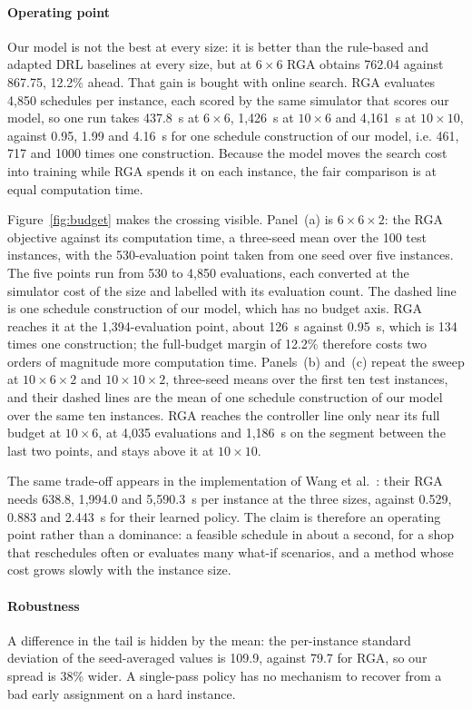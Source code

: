 \paragraph{Operating point}
Our model is not the best at every size: it is better than the rule-based and
adapted DRL baselines at every size, but at $6\times6$ RGA obtains 762.04
against 867.75, 12.2\% ahead. That gain is bought with online search. RGA
evaluates 4{,}850 schedules per instance, each scored by the same simulator
that scores our model, so one run takes 437.8~s at $6\times6$, 1{,}426~s at
$10\times6$ and 4{,}161~s at $10\times10$, against 0.95, 1.99 and 4.16~s for
one schedule construction of our model, i.e. 461, 717 and 1000 times one construction. Because the
model moves the search cost into training while RGA spends it on each
instance, the fair comparison is at equal computation time.

Figure~\ref{fig:budget} makes the crossing visible. Panel~(a) is
$6\times6\times2$: the RGA objective against its computation time, a
three-seed mean over the 100 test instances, with the 530-evaluation point
taken from one seed over five instances. The five points run from 530 to
4{,}850 evaluations, each converted at the simulator cost of the size and
labelled with its evaluation count. The dashed line is one schedule
construction of our model, which has no budget axis. RGA reaches it at the
1{,}394-evaluation point, about 126~s against 0.95~s, which is 134 times one
construction; the full-budget margin of 12.2\% therefore costs two orders of
magnitude more computation time. Panels~(b) and~(c) repeat the sweep at
$10\times6\times2$ and $10\times10\times2$, three-seed means over the first ten
test instances, and their dashed lines are the mean of one schedule
construction of our model over the same ten instances. RGA reaches the
controller line only near its full budget at $10\times6$, at 4{,}035
evaluations and 1{,}186~s on the segment between the last two points, and
stays above it at $10\times10$.

The same trade-off
appears in the implementation of Wang et al.~\cite{wang2025multitarget}: their
RGA needs 638.8, 1{,}994.0 and 5{,}590.3~s per instance at the three sizes,
against 0.529, 0.883 and 2.443~s for their learned policy. The claim is
therefore an operating point rather than a dominance: a feasible schedule in
about a second, for a shop that reschedules often or evaluates many what-if
scenarios, and a method whose cost grows slowly with the instance size.

\paragraph{Robustness}
A difference in the tail is hidden by the mean: the per-instance standard
deviation of the seed-averaged values is 109.9, against 79.7 for RGA, so our
spread is 38\% wider. A single-pass policy has no mechanism to recover from a
bad early assignment on a hard instance.





